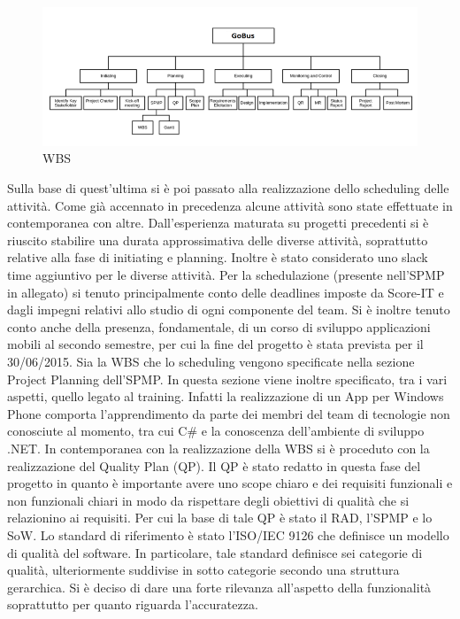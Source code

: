 \begin{figure}[tp]
\centering
\includegraphics[scale=.6]{img/6.png}
\caption{WBS}
\label{fig:cd}
\end{figure}

Sulla base di quest'ultima si è poi passato alla realizzazione dello scheduling delle attività.
Come già accennato in precedenza alcune attività sono state effettuate in contemporanea con altre. Dall’esperienza maturata su progetti precedenti si è riuscito stabilire una durata approssimativa delle diverse attività, soprattutto relative alla fase di initiating e planning.
Inoltre è stato considerato uno slack time aggiuntivo per le diverse attività.
Per la schedulazione (presente nell\rq SPMP in allegato) si  tenuto principalmente conto delle deadlines imposte da Score-IT e dagli impegni relativi allo studio di ogni componente del team.
Si è inoltre tenuto conto anche della presenza, fondamentale, di un corso di sviluppo applicazioni mobili al secondo semestre, per cui la fine del progetto è stata prevista per il 30/06/2015.
Sia la WBS che lo scheduling vengono specificate nella sezione Project Planning dell’SPMP. In questa sezione viene inoltre specificato, tra i vari aspetti, quello legato al training.
Infatti la realizzazione di un App per Windows Phone comporta 
l\rq apprendimento da parte dei membri del team di tecnologie non conosciute al momento, tra cui C\# e la conoscenza dell’ambiente di sviluppo .NET.
In contemporanea con la realizzazione della WBS si è proceduto con la realizzazione del Quality Plan (QP). 
Il QP è stato redatto in questa fase del progetto in quanto è importante avere uno scope chiaro e dei requisiti funzionali e non funzionali chiari in modo da rispettare degli obiettivi di qualità che si relazionino ai requisiti.
Per cui la base di tale QP è stato il RAD, l’SPMP e lo SoW.
Lo standard di riferimento è stato l’ISO/IEC 9126 che definisce un modello di qualità del software. In particolare, tale standard definisce sei categorie di qualità, ulteriormente suddivise in sotto categorie secondo una struttura gerarchica. Si è deciso di dare una forte rilevanza all’aspetto della funzionalità soprattutto per quanto riguarda l’accuratezza.
